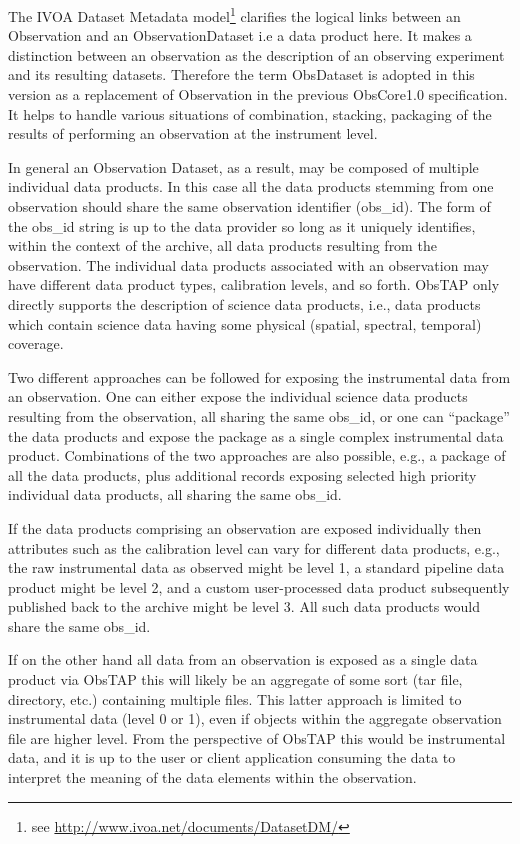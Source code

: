 \documentclass[11pt,a4paper]{ivoa}
\begin{document}
The IVOA Dataset Metadata model\footnote{see \url{http://www.ivoa.net/documents/DatasetDM/}} clarifies the logical links between an
Observation and an ObservationDataset i.e a data product here. It makes a distinction between an
{\textquotedbl}observation{\textquotedbl} as the description of an observing experiment and its resulting datasets.
Therefore the term ObsDataset is adopted in this version as a replacement of Observation in the previous ObsCore1.0
specification. It helps to handle various situations of combination, stacking, packaging of the results of performing
an observation at the instrument level.

In general an Observation Dataset, as a result, may be composed of multiple individual data products.  In this case all
the data products stemming from one observation should share the same observation identifier (obs\_id).  The form of
the obs\_id string is up to the data provider so long as it uniquely identifies, within the context of the archive, all
data products resulting from the observation.  The individual data products associated with an observation may have
different data product types, calibration levels, and so forth.  ObsTAP only directly supports the description of
science data products, i.e., data products which contain science data having some physical (spatial, spectral,
temporal) coverage.

Two different approaches can be followed for exposing the instrumental data from an observation. One can either expose
the individual science data products resulting from the observation, all sharing the same obs\_id, or one can
``package'' the data products and expose the package as a single complex instrumental data product. Combinations of the
two approaches are also possible, e.g., a package of all the data products, plus additional records exposing selected
high priority individual data products, all sharing the same obs\_id.

If the data products comprising an observation are exposed individually then attributes such as the calibration level
can vary for different data products, e.g., the raw instrumental data as observed might be level 1, a standard pipeline
data product might be level 2, and a custom user-processed data product subsequently published back to the archive
might be level 3.  All such data products would share the same obs\_id.

If on the other hand all data from an observation is exposed as a single data product via ObsTAP this will likely be an
aggregate of some sort (tar file, directory, etc.) containing multiple files.  This latter approach is limited to
instrumental data (level 0 or 1), even if objects within the aggregate observation file are higher level.  From the
perspective of ObsTAP this would be instrumental data, and it is up to the user or client application consuming the
data to interpret the meaning of the data elements within the observation.
\end{document}
